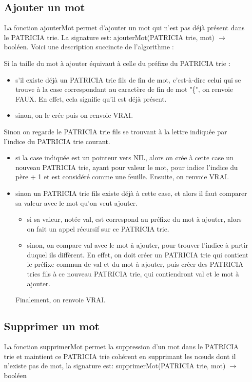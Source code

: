 \documentclass[a4paper,12pt]{report}
\begin{document}
\subsection{Ajouter un mot}
La fonction ajouterMot permet d'ajouter un mot qui n'est pas déjà présent dans le PATRICIA trie. La signature est: ajouterMot(PATRICIA trie, mot) $\rightarrow$ booléen.
Voici une description succincte de l'algorithme :

Si la taille du mot à ajouter équivaut à celle du préfixe du PATRICIA trie :
\begin{itemize}
	\item s'il existe déjà un PATRICIA trie fils de fin de mot, c'est-à-dire celui qui se trouve à la case correspondant au caractère de fin de mot "\{", on renvoie FAUX. En effet, cela signifie qu'il est déjà présent. 
	\item sinon, on le crée puis on renvoie VRAI.
\end{itemize}
\smallbreak
Sinon on regarde le PATRICIA trie fils se trouvant à la lettre indiquée par l'indice du PATRICIA trie courant.
\begin{itemize}
	\item si la case indiquée est un pointeur vers NIL, alors on crée à cette case un nouveau PATRICIA trie, ayant pour valeur le mot, pour indice l'indice du père + 1 et est considéré comme une feuille. Ensuite, on renvoie VRAI.
	\item sinon un PATRICIA trie fils existe déjà à cette case, et alors il faut comparer sa valeur avec le mot qu'on veut ajouter.
	\begin{itemize}
			\item si sa valeur, notée val, est correspond au préfixe du mot à ajouter, alors on fait un appel récursif sur ce PATRICIA trie.
			\item sinon, on compare val avec le mot à ajouter, pour trouver l'indice à partir duquel ils diffèrent. En effet, on doit créer un PATRICIA trie qui contient le préfixe commun de val et du mot à ajouter, puis créer des PATRICIA tries fils à ce nouveau PATRICIA trie, qui contiendront val et le mot à ajouter.
	\end{itemize}
	Finalement, on renvoie VRAI.
\end{itemize}


\subsection{Supprimer un mot}
La fonction supprimerMot permet la suppression d'un mot dans le PATRICIA trie et maintient ce PATRICIA trie cohérent en supprimant
les nœuds dont il n'existe pas de mot, la signature est: supprimerMot(PATRICIA trie, mot) $\rightarrow$ booléen
\end{document}

